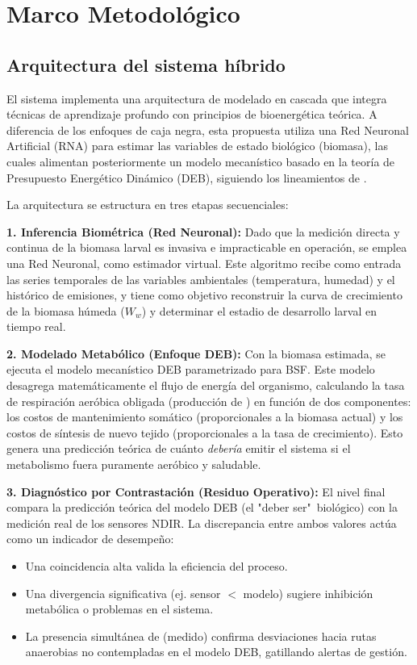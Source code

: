 \chapter{Marco Metodológico}

\section{Arquitectura del sistema híbrido}

El sistema implementa una arquitectura de modelado en cascada que integra técnicas de aprendizaje profundo con principios de bioenergética teórica. A diferencia de los enfoques de caja negra, esta propuesta utiliza una Red Neuronal Artificial (RNA) para estimar las variables de estado biológico (biomasa), las cuales alimentan posteriormente un modelo mecanístico basado en la teoría de Presupuesto Energético Dinámico (DEB), siguiendo los lineamientos de \textcite{eriksenDynamicModellingFeed2022}. 

La arquitectura se estructura en tres etapas secuenciales:

\textbf{1. Inferencia Biométrica (Red Neuronal):} Dado que la medición directa y continua de la biomasa larval es invasiva e impracticable en operación, se emplea una Red Neuronal, como estimador virtual. Este algoritmo recibe como entrada las series temporales de las variables ambientales (temperatura, humedad) y el histórico de emisiones, y tiene como objetivo reconstruir la curva de crecimiento de la biomasa húmeda ($W_w$) y determinar el estadio de desarrollo larval en tiempo real.

\textbf{2. Modelado Metabólico (Enfoque DEB):} Con la biomasa estimada, se ejecuta el modelo mecanístico DEB parametrizado para BSF. Este modelo desagrega matemáticamente el flujo de energía del organismo, calculando la tasa de respiración aeróbica obligada (producción de ) en función de dos componentes: los costos de mantenimiento somático (proporcionales a la biomasa actual) y los costos de síntesis de nuevo tejido (proporcionales a la tasa de crecimiento). Esto genera una predicción teórica de cuánto  \textit{debería} emitir el sistema si el metabolismo fuera puramente aeróbico y saludable.

\textbf{3. Diagnóstico por Contrastación (Residuo Operativo):} El nivel final compara la predicción teórica del modelo DEB (el "deber ser"\ biológico) con la medición real de los sensores NDIR. La discrepancia entre ambos valores actúa como un indicador de desempeño:\begin{itemize}\item Una coincidencia alta valida la eficiencia del proceso.\item Una divergencia significativa (ej. sensor $<$ modelo) sugiere inhibición metabólica o problemas en el sistema.\item La presencia simultánea de  (medido) confirma desviaciones hacia rutas anaerobias no contempladas en el modelo DEB, gatillando alertas de gestión.\end{itemize}


